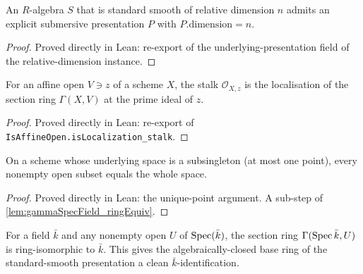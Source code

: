\begin{lemma}
  \label{lem:exists_submersivePresentation_of_standardSmoothReldim}
  An \(R\)-algebra \(S\) that is standard smooth of relative dimension \(n\) admits an
  explicit submersive presentation \(P\) with \(P.\mathrm{dimension} = n\).
\end{lemma}

\begin{proof}
  Proved directly in Lean: re-export of the underlying-presentation field of the
  relative-dimension instance.
\end{proof}

\begin{lemma}
  \label{lem:isLocalization_atPrime_stalk_of_affineOpen}
  For an affine open \(V \ni z\) of a scheme \(X\), the stalk \(\mathcal O_{X,z}\) is
  the localisation of the section ring \(\Gamma(X, V)\) at the prime ideal of \(z\).
\end{lemma}

\begin{proof}
  Proved directly in Lean: re-export of \texttt{IsAffineOpen.isLocalization\_stalk}.
\end{proof}

\begin{lemma}
  \label{lem:open_eq_top_of_subsingleton}
  On a scheme whose underlying space is a subsingleton (at most one point), every
  nonempty open subset equals the whole space.
\end{lemma}

\begin{proof}
  Proved directly in Lean: the unique-point argument. A sub-step of
  \cref{lem:gammaSpecField_ringEquiv}.
\end{proof}

\begin{lemma}
  \label{lem:gammaSpecField_ringEquiv}
  For a field \(\bar k\) and any nonempty open \(U\) of \(\operatorname{Spec}(\bar k)\), the section
  ring \(\Gamma(\operatorname{Spec} \bar k, U)\) is ring-isomorphic to \(\bar k\). This gives the
  algebraically-closed base ring of the standard-smooth presentation a clean
  \(\bar k\)-identification.
\end{lemma}

